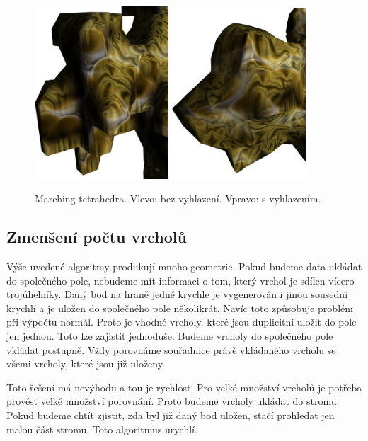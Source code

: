 \begin{figure}[htb]
\centering
\includegraphics[width=5cm,keepaspectratio]{obr/mt_nevyhlaz.jpg}
\includegraphics[width=5cm,keepaspectratio]{obr/mt_vyhlaz.jpg}
\caption{Marching tetrahedra. Vlevo: bez vyhlazení. Vpravo: s vyhlazením.}
\label{fig:vyhlaz}
\end{figure}

\subsection{Zmenšení počtu vrcholů}
Výše uvedené algoritmy produkují mnoho geometrie.
Pokud budeme data ukládat do spo\-leč\-né\-ho pole, nebudeme mít informaci o tom, který vrchol je sdílen vícero trojúhelníky.
Daný bod na hraně jedné krychle je vygenerován i jinou sousední krychlí a je uložen do společného pole několikrát.
Navíc toto způsobuje problém při výpočtu normál.
Proto je vhodné vrcholy, které jsou duplicitní uložit do pole jen jednou.
Toto lze zajistit jednoduše.
Budeme vrcholy do společného pole vkládat postupně.
Vždy porovnáme souřadnice právě vkládaného vrcholu se všemi vrcholy, které jsou již uloženy.

Toto řešení má nevýhodu a tou je rychlost.
Pro velké množství vrcholů je potřeba provést velké množství porovnání.
Proto budeme vrcholy ukládat do stromu.
Pokud budeme chtít zjistit, zda byl již daný bod uložen, stačí prohledat jen malou část stromu.
Toto algoritmus urychlí.

